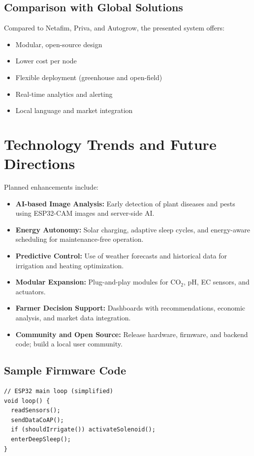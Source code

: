 \documentclass[12pt,a4paper]{article}
\begin{document}
\subsection{Comparison with Global Solutions}
Compared to Netafim, Priva, and Autogrow, the presented system offers:
\begin{itemize}
    \item Modular, open-source design
    \item Lower cost per node
    \item Flexible deployment (greenhouse and open-field)
    \item Real-time analytics and alerting
    \item Local language and market integration
\end{itemize}

\section{Technology Trends and Future Directions}
Planned enhancements include:
\begin{itemize}
    \item \textbf{AI-based Image Analysis:} Early detection of plant diseases and pests using ESP32-CAM images and server-side AI.
    \item \textbf{Energy Autonomy:} Solar charging, adaptive sleep cycles, and energy-aware scheduling for maintenance-free operation.
    \item \textbf{Predictive Control:} Use of weather forecasts and historical data for irrigation and heating optimization.
    \item \textbf{Modular Expansion:} Plug-and-play modules for CO$_2$, pH, EC sensors, and actuators.
    \item \textbf{Farmer Decision Support:} Dashboards with recommendations, economic analysis, and market data integration.
    \item \textbf{Community and Open Source:} Release hardware, firmware, and backend code; build a local user community.
\end{itemize}

\subsection{Sample Firmware Code}
\begin{verbatim}
// ESP32 main loop (simplified)
void loop() {
  readSensors();
  sendDataCoAP();
  if (shouldIrrigate()) activateSolenoid();
  enterDeepSleep();
}
\end{verbatim}
\end{document}
